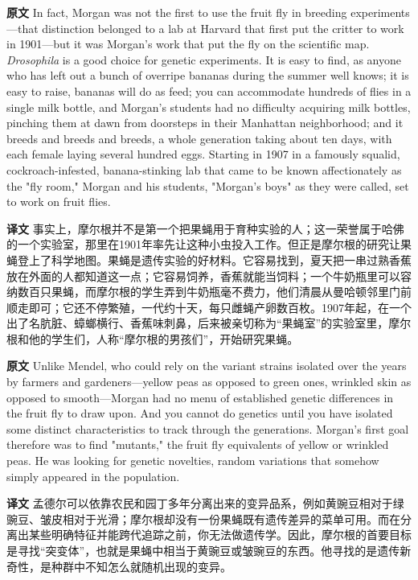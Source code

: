 \documentclass[UTF8,zihao=-4]{ctexart}
\newcommand{\BodyFont}{\fontsize{10.5pt}{15.5pt}\selectfont}
\renewenvironment{quote}{\par\noindent\begingroup\BodyFont}{\par\endgroup}
\begin{document}
\begin{quote}
\noindent\textbf{原文} In fact, Morgan was not the first to use the fruit fly in breeding experiments---that distinction belonged to a lab at Harvard that first put the critter to work in 1901---but it was Morgan's work that put the fly on the scientific map. \emph{Drosophila} is a good choice for genetic experiments. It is easy to find, as anyone who has left out a bunch of overripe bananas during the summer well knows; it is easy to raise, bananas will do as feed; you can accommodate hundreds of flies in a single milk bottle, and Morgan's students had no difficulty acquiring milk bottles, pinching them at dawn from doorsteps in their Manhattan neighborhood; and it breeds and breeds and breeds, a whole generation taking about ten days, with each female laying several hundred eggs. Starting in 1907 in a famously squalid, cockroach-infested, banana-stinking lab that came to be known affectionately as the "fly room," Morgan and his students, "Morgan's boys" as they were called, set to work on fruit flies.

\smallskip
\noindent\textbf{译文} 事实上，摩尔根并不是第一个把果蝇用于育种实验的人；这一荣誉属于哈佛的一个实验室，那里在1901年率先让这种小虫投入工作。但正是摩尔根的研究让果蝇登上了科学地图。果蝇是遗传实验的好材料。它容易找到，夏天把一串过熟香蕉放在外面的人都知道这一点；它容易饲养，香蕉就能当饲料；一个牛奶瓶里可以容纳数百只果蝇，而摩尔根的学生弄到牛奶瓶毫不费力，他们清晨从曼哈顿邻里门前顺走即可；它还不停繁殖，一代约十天，每只雌蝇产卵数百枚。1907年起，在一个出了名肮脏、蟑螂横行、香蕉味刺鼻，后来被亲切称为“果蝇室”的实验室里，摩尔根和他的学生们，人称“摩尔根的男孩们”，开始研究果蝇。
\end{quote}

\begin{quote}
\noindent\textbf{原文} Unlike Mendel, who could rely on the variant strains isolated over the years by farmers and gardeners---yellow peas as opposed to green ones, wrinkled skin as opposed to smooth---Morgan had no menu of established genetic differences in the fruit fly to draw upon. And you cannot do genetics until you have isolated some distinct characteristics to track through the generations. Morgan's first goal therefore was to find "mutants," the fruit fly equivalents of yellow or wrinkled peas. He was looking for genetic novelties, random variations that somehow simply appeared in the population.

\smallskip
\noindent\textbf{译文} 孟德尔可以依靠农民和园丁多年分离出来的变异品系，例如黄豌豆相对于绿豌豆、皱皮相对于光滑；摩尔根却没有一份果蝇既有遗传差异的菜单可用。而在分离出某些明确特征并能跨代追踪之前，你无法做遗传学。因此，摩尔根的首要目标是寻找“突变体”，也就是果蝇中相当于黄豌豆或皱豌豆的东西。他寻找的是遗传新奇性，是种群中不知怎么就随机出现的变异。
\end{quote}
\end{document}

